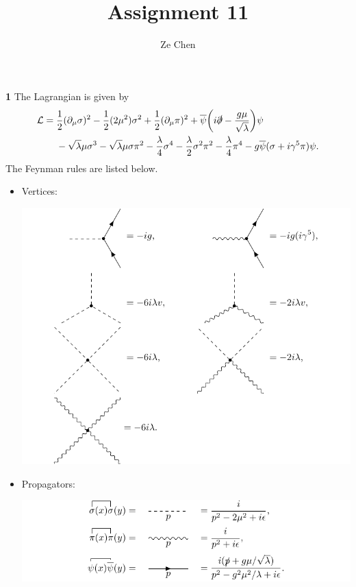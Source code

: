 \documentclass{article}
\title{Assignment 11}
\author{Ze Chen}
\makeatletter
\newcommand*{\shifttext}[1]{%
  \settowidth{\@tempdima}{#1}%
  \hspace{-\@tempdima}#1%
}
\newcommand{\plabel}[1]{%
\shifttext{\textbf{#1}\quad}%
}
\makeatother
\begin{document}
\maketitle

\plabel{1}%
The Lagrangian is given by
\begin{align*}
    \mathcal{L} &= \frac{1}{2}(\partial_\mu \sigma)^2 - \frac{1}{2}(2\mu^2)\sigma^2 + \frac{1}{2}(\partial_\mu \pi)^2 + \overline{\psi}\qty(i\slashed{\partial} - \frac{g\mu}{\sqrt{\lambda}}) \psi \\
    &\phantom{{}={}} - \sqrt{\lambda}\mu\sigma^3 - \sqrt{\lambda}\mu\sigma \pi^2 - \frac{\lambda}{4}\sigma^4 - \frac{\lambda}{2} \sigma^2 \pi^2 - \frac{\lambda}{4}\pi^4 - g\overline{\psi}(\sigma + i\gamma^5 \pi) \psi.
\end{align*}
The Feynman rules are listed below.
\begin{itemize}
  \item Vertices:
  \begin{center}
    \includegraphics{img/yukawa/broken/vertex/vertex.pdf}
  \end{center}
  \item Propagators:
  \begin{center}
    \includegraphics{img/yukawa/broken/propagator/propagator.pdf}
  \end{center}
\end{itemize}
\end{document}
